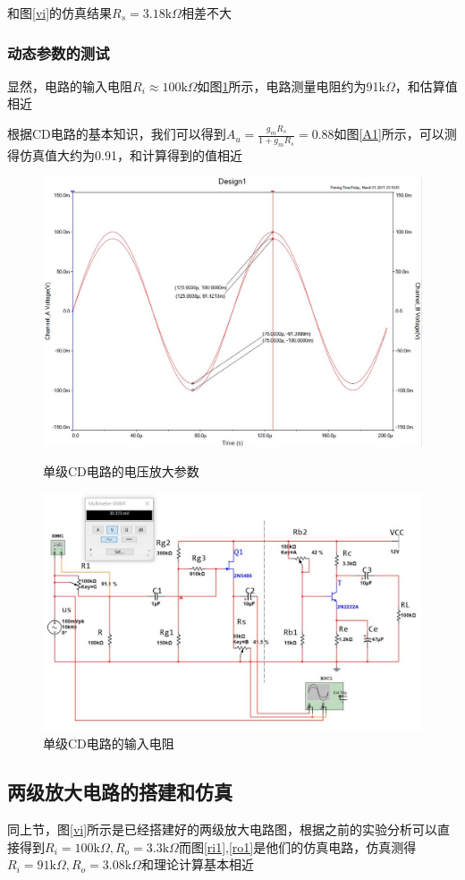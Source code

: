 \documentclass[UTF8,a4paper]{ctexart}
\begin{document}
和图\ref{vi}的仿真结果$R_s=3.18\mathrm{k}\Omega$相差不大
\subsubsection{动态参数的测试}
显然，电路的输入电阻$R_i\approx100\mathrm{k}\Omega$如图\ref{ri}所示，电路测量电阻约为91$\mathrm{k}\Omega$，和估算值相近

根据CD电路的基本知识，我们可以得到$\displaystyle{A_u=\frac{g_mR_s}{1+g_mR_s}=0.88}$如图\ref{A1}所示，可以测得仿真值大约为0.91，和计算得到的值相近
\begin{figure}
\centering
\includegraphics[width=\textwidth]{AA.jpg}
\caption{单级CD电路的电压放大参数}
\label{A1}
\includegraphics [width=\textwidth]{Ri.jpg}
\caption{单级CD电路的输入电阻}
\label{ri}
\end{figure}
\subsection{两级放大电路的搭建和仿真}
同上节，图\ref{vi}所示是已经搭建好的两级放大电路图，根据之前的实验分析可以直接得到$R_i=100\mathrm{k}\Omega,R_o=3.3\mathrm{k}\Omega$而图\ref{ri1},\ref{ro1}是他们的仿真电路，仿真测得$R_i=91\mathrm{k}\Omega,R_o=3.08\mathrm{k}\Omega$和理论计算基本相近
\end{document}
